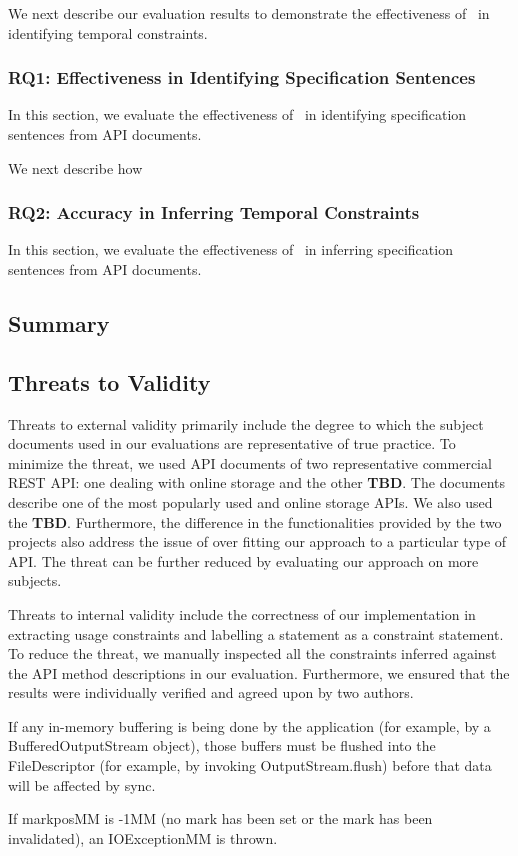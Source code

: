 We next describe our evaluation results to demonstrate the effectiveness of \tool\ in identifying temporal constraints.

\subsubsection{RQ1: Effectiveness in Identifying Specification Sentences}


In this section, we evaluate the effectiveness of \tool\ in identifying specification sentences from API documents.

We next describe how 

\subsubsection{RQ2: Accuracy in Inferring Temporal Constraints}

In this section, we evaluate the effectiveness of \tool\ in inferring specification sentences from API documents.

\subsection{Summary}
\label{sub:summary}



\subsection{Threats to Validity}
\label{sub:threats_to_validity}
Threats to external validity primarily include the degree to which the subject documents used in our evaluations are representative of true practice. To minimize the threat, we used API documents of two representative commercial REST API: one dealing with online storage and the other \textbf{TBD}. The \amazon documents describe one of the most popularly used and online storage APIs. We also used the \textbf{TBD}. Furthermore, the difference in the functionalities provided by the two projects also address the issue of over fitting our approach to a particular type of API. The threat can be further reduced by evaluating our approach on more subjects. 

Threats to internal validity include the correctness of our implementation in extracting usage constraints and labelling a statement as a constraint statement. To reduce the threat, we manually inspected all the constraints inferred against the API method descriptions in our evaluation. Furthermore, we ensured that the results were individually verified and agreed
upon by two authors.




If any in-memory buffering is being done by the application (for example, by a BufferedOutputStream object), those buffers must be flushed into the FileDescriptor (for example, by invoking OutputStream.flush) before that data will be affected by sync.


If markposMM is -1MM (no mark has been set or the mark has been invalidated), an IOExceptionMM is thrown.